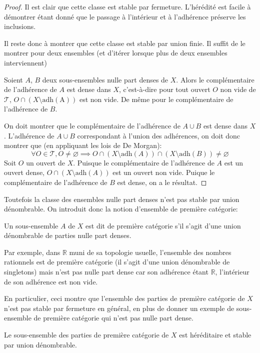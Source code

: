 \begin{proof}
  Il est clair que cette classe est stable par fermeture. L'hérédité est
  facile à démontrer étant donné que le passage à l'intérieur et à l'adhérence
  préserve les inclusions.

  Il reste donc à montrer que cette classe est stable par union finie.
  Il suffit de le montrer pour deux ensembles (et d'itérer lorsque plus de
  deux ensembles interviennent)

  Soient
  $A$, $B$ deux sous-ensembles nulle part denses de $X$. Alors le complémentaire
  de l'adhérence de $A$ est dense dans $X$, c'est-à-dire pour tout ouvert $O$ non vide
  de $\mathcal{T}$, $O\cap (X\setminus \mathrm{adh(A)})$ est non vide. De même
  pour le complémentaire de l'adhérence de $B$.

  On doit montrer que le complémentaire de l'adhérence de $A\cup B$ est dense
  dans $X$. L'adhérence de $A\cup B$ correspondant à l'union des adhérences,
  on doit donc montrer que (en appliquant les lois de De Morgan):
  $$\forall O \in \mathcal{T}, O\neq \varnothing\implies
  O \cap (X\setminus \mathrm{adh}(A))\cap (X\setminus \mathrm{adh}(B))\neq\varnothing$$
  Soit $O$ un ouvert de $X$.
  Puisque le complémentaire de l'adhérence de $A$ est un ouvert dense,
  $O\cap (X\setminus \mathrm{adh}(A))$ est un ouvert non vide. Puique
  le complémentaire de l'adhérence de $B$ est dense, on a le résultat.
\end{proof}

Toutefois la classe des ensembles nulle part denses n'est pas stable par union
dénombrable. On introduit donc la notion d'ensemble de première catégorie:

\begin{df}
  Un sous-ensemble $A$ de $X$ est dit de première catégorie s'il s'agit d'une
  union dénombrable de parties nulle part denses.
\end{df}

Par exemple, dans $\mathbb{R}$ muni de sa topologie usuelle, l'ensemble
des nombres rationnels est de première catégorie (il s'agit d'une union
dénombrable de singletons) mais n'est pas nulle part dense car son
adhérence étant $\mathbb{R}$, l'intérieur de son adhérence est non vide.

En particulier, ceci montre que l'ensemble des parties de première
catégorie de $X$ n'est pas stable par fermeture en général, en plus de
donner un exemple de sous-ensemble de première catégorie qui n'est pas
nulle part dense.

\begin{prop}
  Le sous-ensemble des parties de première catégorie de $X$ est héréditaire
  et stable par union dénombrable.
\end{prop}

